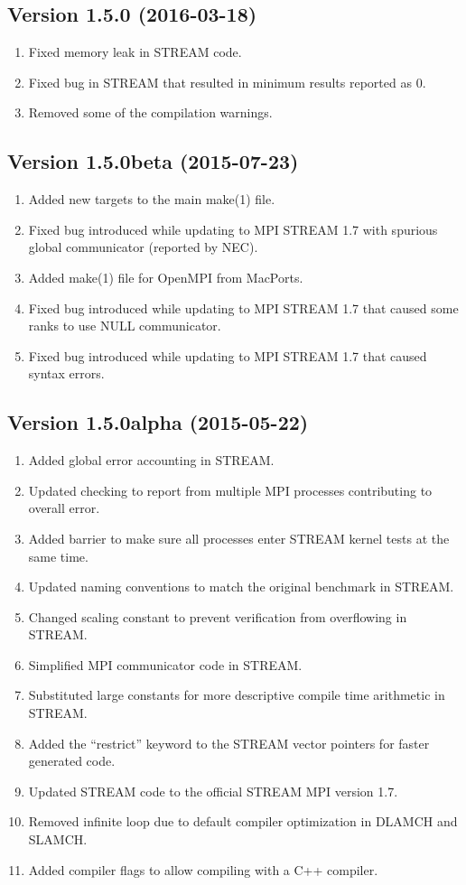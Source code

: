 \documentclass[twocolumn]{article}
\begin{document}
\subsection{Version 1.5.0 (2016-03-18)}
\begin{enumerate}
  \item Fixed memory leak in STREAM code.
  \item Fixed bug in STREAM that resulted in minimum results reported as 0.
  \item Removed some of the compilation warnings.
\end{enumerate}

\subsection{Version 1.5.0beta (2015-07-23)}
\begin{enumerate}
  \item Added new targets to the main make(1) file.
  \item Fixed bug introduced while updating to MPI STREAM 1.7 with spurious global communicator (reported by NEC).
  \item Added make(1) file for OpenMPI from MacPorts.
  \item Fixed bug introduced while updating to MPI STREAM 1.7 that caused some ranks to use NULL communicator.
  \item Fixed bug introduced while updating to MPI STREAM 1.7 that caused syntax errors.
\end{enumerate}

\subsection{Version 1.5.0alpha (2015-05-22)}
\begin{enumerate}
  \item Added global error accounting in STREAM.
  \item Updated checking to report from multiple MPI processes contributing to overall error.
  \item Added barrier to make sure all processes enter STREAM kernel tests at the same time.
  \item Updated naming conventions to match the original benchmark in STREAM.
  \item Changed scaling constant to prevent verification from overflowing in STREAM.
  \item Simplified MPI communicator code in STREAM.
  \item Substituted large constants for more descriptive compile time arithmetic in STREAM.
  \item Added the ``restrict'' keyword to the STREAM vector pointers for faster generated code.
  \item Updated STREAM code to the official STREAM MPI version 1.7.
  \item Removed infinite loop due to default compiler optimization in DLAMCH and SLAMCH.
  \item Added compiler flags to allow compiling with a C++ compiler.
\end{enumerate}
\end{document}

